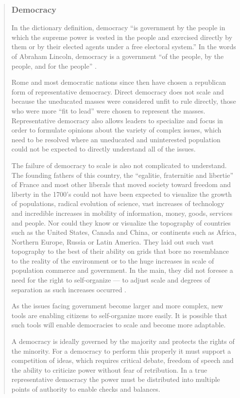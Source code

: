 \begin{quote}
\subsubsection{Democracy}

In the dictionary definition, democracy ``is government by the people in which the supreme power is vested in the people and exercised directly by them or by their elected agents under a free electoral system.'' In the words of Abraham Lincoln, democracy is a government ``of the people, by the people, and for the people'' \cite{lessig2002future}.

Rome and most democratic nations since then have chosen a republican form of representative democracy. Direct democracy does not scale and because the uneducated masses were considered unfit to rule directly, those who were more ``fit to lead'' were chosen to represent the masses. Representative democracy also allows leaders to specialize and focus in order to formulate opinions about the variety of complex issues, which need to be resolved where an uneducated and uninterested population could not be expected to directly understand all of the issues.

The failure of democracy to scale is also not complicated to understand. The founding fathers of this country, the ``egalitie, fraternitie and libertie'' of France and most other liberals that moved society toward freedom and liberty in the 1700's could not have been expected to visualize the growth of populations, radical evolution of science, vast increases of technology and incredible increases in mobility of information, money, goods, services and people. Nor could they know or visualize the topography of countries such as the United States, Canada and China, or continents such as Africa, Northern Europe, Russia or Latin America. They laid out such vast topography to the best of their ability on grids that bore no resemblance to the reality of the environment or to the huge increases in scale of population commerce and government. In the main, they did not foresee a need for the right to self-organize --- to adjust scale and degrees of separation as such increases occurred \cite{deehockjoiitoweb}.

As the issues facing government become larger and more complex, new tools are enabling citizens to self-organize more easily. It is possible that such tools will enable democracies to scale and become more adaptable.

A democracy is ideally governed by the majority and protects the rights of the minority. For a democracy to perform this properly it must support a competition of ideas, which requires critical debate, freedom of speech and the ability to criticize power without fear of retribution. In a true representative democracy the power must be distributed into multiple points of authority to enable checks and balances.


\end{quote}
